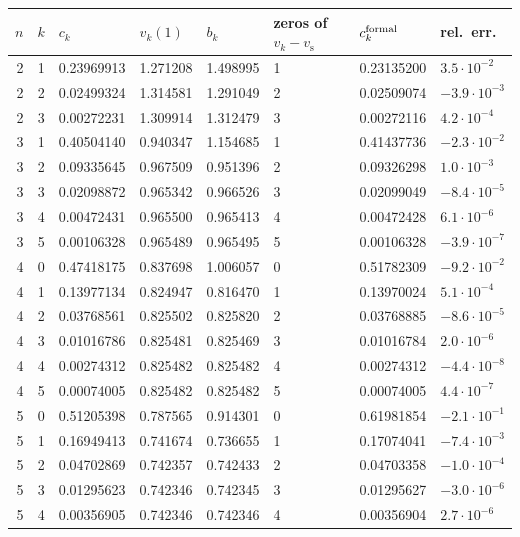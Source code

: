 \documentclass[11pt,a4paper]{amsart}
\theoremstyle{definition}
\theoremstyle{remark}
\newcommand{\vs}{v_{\mathrm{s}}}
\begin{document}
\begin{table}[ht]
\centering\small
\begin{tabular}{rrllllll}\toprule
$n$ & $k$ & $c_k$ & $v_k(1)$ & $b_k$ & zeros of $v_k-\vs$ & $c_k^{\rm formal}$ & rel.\ err.\\ \midrule
2 & 1 & 0.23969913 & 1.271208 & 1.498995 & 1 & 0.23135200 & $3.5\cdot10^{-2}$\\
2 & 2 & 0.02499324 & 1.314581 & 1.291049 & 2 & 0.02509074 & $-3.9\cdot10^{-3}$\\
2 & 3 & 0.00272231 & 1.309914 & 1.312479 & 3 & 0.00272116 & $4.2\cdot10^{-4}$\\ \midrule
3 & 1 & 0.40504140 & 0.940347 & 1.154685 & 1 & 0.41437736 & $-2.3\cdot10^{-2}$\\
3 & 2 & 0.09335645 & 0.967509 & 0.951396 & 2 & 0.09326298 & $1.0\cdot10^{-3}$\\
3 & 3 & 0.02098872 & 0.965342 & 0.966526 & 3 & 0.02099049 & $-8.4\cdot10^{-5}$\\
3 & 4 & 0.00472431 & 0.965500 & 0.965413 & 4 & 0.00472428 & $6.1\cdot10^{-6}$\\
3 & 5 & 0.00106328 & 0.965489 & 0.965495 & 5 & 0.00106328 & $-3.9\cdot10^{-7}$\\ \midrule
4 & 0 & 0.47418175 & 0.837698 & 1.006057 & 0 & 0.51782309 & $-9.2\cdot10^{-2}$\\
4 & 1 & 0.13977134 & 0.824947 & 0.816470 & 1 & 0.13970024 & $5.1\cdot10^{-4}$\\
4 & 2 & 0.03768561 & 0.825502 & 0.825820 & 2 & 0.03768885 & $-8.6\cdot10^{-5}$\\
4 & 3 & 0.01016786 & 0.825481 & 0.825469 & 3 & 0.01016784 & $2.0\cdot10^{-6}$\\
4 & 4 & 0.00274312 & 0.825482 & 0.825482 & 4 & 0.00274312 & $-4.4\cdot10^{-8}$\\
4 & 5 & 0.00074005 & 0.825482 & 0.825482 & 5 & 0.00074005 & $4.4\cdot10^{-7}$\\ \midrule
5 & 0 & 0.51205398 & 0.787565 & 0.914301 & 0 & 0.61981854 & $-2.1\cdot10^{-1}$\\
5 & 1 & 0.16949413 & 0.741674 & 0.736655 & 1 & 0.17074041 & $-7.4\cdot10^{-3}$\\
5 & 2 & 0.04702869 & 0.742357 & 0.742433 & 2 & 0.04703358 & $-1.0\cdot10^{-4}$\\
5 & 3 & 0.01295623 & 0.742346 & 0.742345 & 3 & 0.01295627 & $-3.0\cdot10^{-6}$\\
5 & 4 & 0.00356905 & 0.742346 & 0.742346 & 4 & 0.00356904 & $2.7\cdot10^{-6}$\\ \midrule

\end{tabular}
\end{table}
\end{document}
